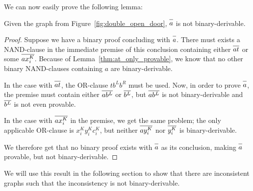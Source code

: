 We can now easily prove the following lemma:
\begin{lemma}
  Given the graph from Figure~\ref{fig:double_open_door}, $\ol{a}$ is not binary-derivable.
  \label{thm:a_not_binary_derivable}
\end{lemma}
\begin{proof}
Suppose we have a binary proof concluding with $\ol{a}$.
There must exists a NAND-clause in the immediate premise of this conclusion containing either $\ol{at}$ or some $\ol{ax^K_i}$.
Because of Lemma~\ref{thm:at_only_provable}, we know that no other binary NAND-clauses containing $a$ are binary-derivable.

In the case with $\ol{at}$, the OR-clause $tb^Lb^R$ must be used.
Now, in order to prove $\ol{a}$, the premise must contain either $\ol{a b^L}$ or $\ol{b^L}$, but $\ol{a b^L}$ is not binary-derivable and $\ol{b^L}$ is not even provable.

In the case with $\ol{ax^K_i}$ in the premise, we get the same problem;
the only applicable OR-clause is $x^K_iy^K_ic^K_i$, but neither $\ol{a y^K_i}$ nor $\ol{y^K_i}$ is binary-derivable.

We therefore get that no binary proof exists with $\ol{a}$ as its conclusion, making $\ol{a}$ provable, but not binary-derivable.
\end{proof}
We will use this result in the following section to show that there are inconsistent graphs such that the inconsistency is not binary-derivable.
